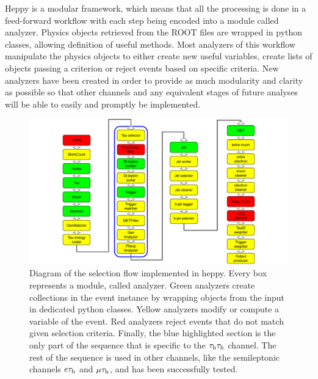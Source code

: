 Heppy is a modular framework, which means that all the processing is done in a feed-forward workflow with each step being encoded into a module called analyzer. Physics objects retrieved from the ROOT files are wrapped in python classes, allowing definition of useful methods. Most analyzers of this workflow manipulate the physics objects to either create new useful variables, create lists of objects passing a criterion or reject events based on specific criteria. New analyzers have been created in order to provide as much modularity and clarity as possible so that other channels and any equivalent stages of future analyses will be able to easily and promptly be implemented.


\begin{figure}
    \centering
    \includegraphics[width=\textwidth]{Images/HEPPY_diagram.pdf}
    \caption{Diagram of the selection flow implemented in heppy. Every box represents a module, called analyzer. Green analyzers create collections in the event instance by wrapping objects from the input in dedicated python classes. Yellow analyzers modify or compute a variable of the event. Red analyzers reject events that do not match given selection criteria. Finally, the blue highlighted section is the only part of the sequence that is specific to the $\tau_{\rm h}\tau_{\rm h}$ channel. The rest of the sequence is used in other channels, like the semileptonic channels $e\tau_{\rm h}$ and $\mu\tau_{\rm h}$, and has been successfully tested.}
    \label{fig:HEPPY}
\end{figure}

